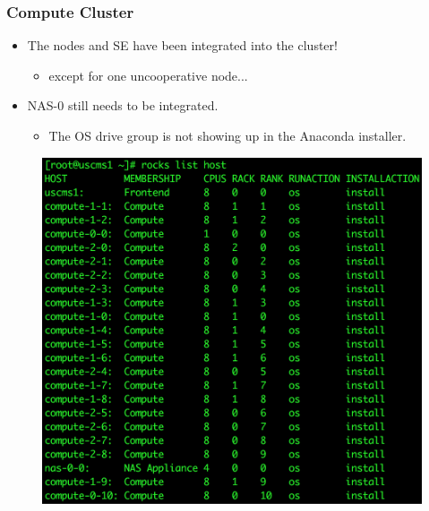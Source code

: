 \documentclass[aspectratio=169]{beamer}
\begin{document}
\begin{frame}

  \frametitle{Compute Cluster}

  \begin{multicols}{2}

  \begin{itemize}
    \item The nodes and SE have been integrated into the cluster!
      \begin{itemize}
        \item except for one uncooperative node...
      \end{itemize}
    \item NAS-0 still needs to be integrated.
      \begin{itemize}
        \item The OS drive group is not showing up in the Anaconda installer.
      \end{itemize}
  \end{itemize}

  \columnbreak
  
  \begin{figure}[H]
    \begin{center}
      \includegraphics[width=1.0\textwidth]{rocksHostList.png}
    \end{center}
  \end{figure}

  \end{multicols}

\end{frame}
\end{document}
